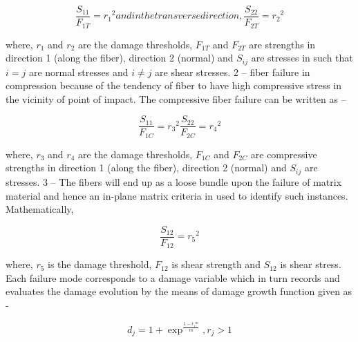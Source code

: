 \documentclass[a4paper,11pt, hidelinks]{article}
\begin{document}
\begin{subequations}
    \begin{equation}
        \frac{S_{11}}{F_{1T}}  = {r_1}^2
    \end{equation}

and in the transverse direction,

    \begin{equation}
        \frac{S_{22}}{F_{2T}}  = {r_2}^2
    \end{equation}
\end{subequations}

where, $r_1$ and $r_2$ are the damage thresholds, $F_{1T}$ and $F_{2T}$ are strengths in direction 1 (along the fiber), direction 2 (normal) and $S_{ij}$ are stresses in such that $i = j$ are normal stresses and $i \neq j$ are shear stresses. 2 – fiber failure in compression because of the tendency of fiber to have high compressive stress in the vicinity of point of impact. The compressive fiber failure can be written as –

\begin{subequations}
    \begin{equation}
        \frac{S_{11}}{F_{1C}}  = {r_3}^2
    \end{equation}

    \begin{equation}
        \frac{S_{22}}{F_{2C}}  = {r_4}^2
    \end{equation}
\end{subequations}

where, $r_3$ and $r_4$ are the damage thresholds, $F_{1C}$ and $F_{2C}$ are compressive strengths in direction 1 (along the fiber), direction 2 (normal) and $S_{ij}$ are stresses. 3 – The fibers will end up as a loose bundle upon the failure of matrix material and hence an in-plane matrix criteria in used to identify such instances. Mathematically,

\begin{equation}
    \frac{S_{12}}{F_{12}}  = {r_5}^2
\end{equation}

where, $r_5$ is the damage threshold, $F_{12}$ is shear strength and $S_{12}$ is shear stress. Each failure mode corresponds to a damage variable which in turn records and evaluates the damage evolution by the means of damage growth function given as -

\begin{equation}
    d_j = 1 + \exp^{\frac{1-{r_i}^m}{m}} , r_j > 1
\end{equation}
\end{document}
